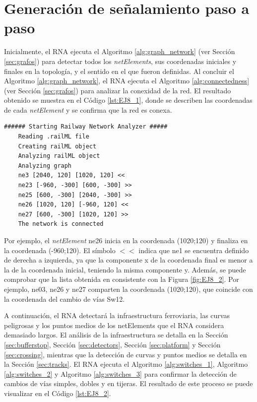 \section{Generación de señalamiento paso a paso}

	Inicialmente, el RNA ejecuta el Algoritmo \ref{alg:graph_network} (ver Sección \ref{sec:grafos}) para detectar todos los \textit{netElements}, sus coordenadas iniciales y finales en la topología, y el sentido en el que fueron definidas. Al concluir el Algoritmo \ref{alg:graph_network}, el RNA ejecuta el Algoritmo \ref{alg:connectedness} (ver Sección \ref{sec:grafos}) para analizar la conexidad de la red. El resultado obtenido se muestra en el Código \ref{lst:EJ8_1}, donde se describen las coordenadas de cada \textit{netElement} y se confirma que la red es conexa.
	
	\begin{lstlisting}[language = {}, caption = Detección de \textit{netElements} por parte del RNA , label = {lst:EJ8_1}]
	###### Starting Railway Network Analyzer #####
	Reading .railML file
	Creating railML object
	Analyzing railML object
	Analyzing graph
	ne3 [2040, 120] [1020, 120] <<
	ne23 [-960, -300] [600, -300] >>
	ne25 [600, -300] [2040, -300] >>
	ne26 [1020, 120] [-960, 120] <<
	ne27 [600, -300] [1020, 120] >>
	The network is connected
	\end{lstlisting}
	
	Por ejemplo, el \textit{netElement} ne26 inicia en la coordenada (1020;120) y finaliza en la coordenada (-960;120). El símbolo $<<$ indica que ne1 se encuentra definido de derecha a izquierda, ya que la componente x de la coordenada final es menor a la de la coordenada inicial, teniendo la misma componente y. Además, se puede comprobar que la lista obtenida en consistente con la Figura \ref{fig:EJ8_2}. Por ejemplo, ne03, ne26 y ne27 comparten la coordenada (1020;120), que coincide con la coordenada del cambio de vías Sw12.
	
	A continuación, el RNA detectará la infraestructura ferroviaria, las curvas peligrosas y los puntos medios de los netElements que el RNA considera demasiado largos. El análisis de la infraestructura se detalla en la Sección \ref{sec:bufferstop}, Sección \ref{sec:detectors}, Sección \ref{sec:platform} y Sección \ref{sec:crossing}, mientras que la detección de curvas y puntos medios se detalla en la Sección \ref{sec:tracks}. El RNA ejecuta el Algoritmo \ref{alg:switches_1}, Algoritmo \ref{alg:switches_2} y Algoritmo \ref{alg:switches_3} para confirmar la detección de cambios de vías simples, dobles y en tijeras. El resultado de este proceso se puede visualizar en el Código \ref{lst:EJ8_2}.
	

